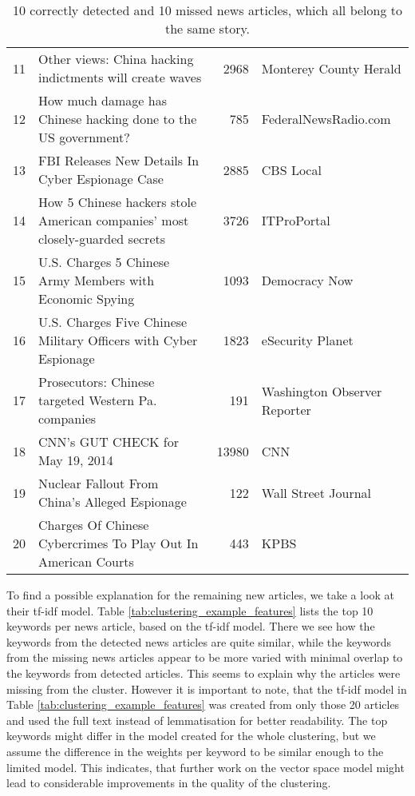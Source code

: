 \begin{table}[h]
{\begin{tabular}{rlrl}
            \hline
                11 & Other views: China hacking indictments will create waves                     &          2968 & Monterey County Herald       \\
                12 & How much damage has Chinese hacking done to the US government?               &           785 & FederalNewsRadio.com         \\
                13 & FBI Releases New Details In Cyber Espionage Case                             &          2885 & CBS Local                    \\
                14 & How 5 Chinese hackers stole American companies' most closely-guarded secrets &          3726 & ITProPortal                  \\
                15 & U.S. Charges 5 Chinese Army Members with Economic Spying                     &          1093 & Democracy Now                \\
                16 & U.S. Charges Five Chinese Military Officers with Cyber Espionage             &          1823 & eSecurity Planet             \\
                17 & Prosecutors: Chinese targeted Western Pa. companies                          &           191 & Washington Observer Reporter \\
                18 & CNN's GUT CHECK for May 19, 2014                                             &         13980 & CNN                  \\
                19 & Nuclear Fallout From China's Alleged Espionage                               &           122 & Wall Street Journal \\
                20 & Charges Of Chinese Cybercrimes To Play Out In American Courts                &           443 & KPBS               \\
                \hline
        \end{tabular}
    }
    \caption{10 correctly detected and 10 missed news articles, which all belong to the same story.}
    \label{tab:clustering_example}
\end{table}

To find a possible explanation for the remaining new articles, we take a look at their tf-idf model. Table \ref{tab:clustering_example_features} lists the top 10 keywords per news article, based on the tf-idf model. There we see how the keywords from the detected news articles are quite similar, while the keywords from the missing news articles appear to be more varied with minimal overlap to the keywords from detected articles. This seems to explain why the articles were missing from the cluster. However it is important to note, that the tf-idf model in Table \ref{tab:clustering_example_features} was created from only those 20 articles and used the full text instead of lemmatisation for better readability. The top keywords might differ in the model created for the whole clustering, but we assume the difference in the weights per keyword to be similar enough to the limited model. This indicates, that further work on the vector space model might lead to considerable improvements in the quality of the clustering.

